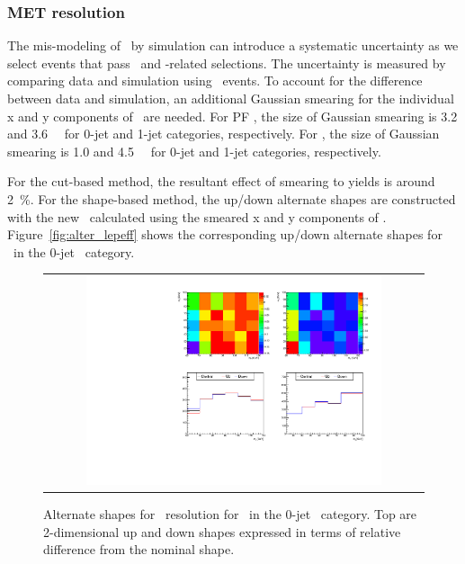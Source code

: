 \subsubsection{MET resolution} 

The mis-modeling of \met\ by simulation can introduce a systematic uncertainty 
as we select events that pass \met\ and \met-related selections. 
The uncertainty is measured 
by comparing data and simulation using \dyll\ events. To account for the 
difference between data and simulation, an additional Gaussian smearing for 
the individual x and y components of \met\ are needed. 
For PF \met, the size of Gaussian smearing is 3.2 and 3.6~\GeV\ %
for 0-jet and 1-jet categories, respectively.  
For \trkmet, the size of Gaussian smearing is 1.0 and 4.5~\GeV\ %
for 0-jet and 1-jet categories, respectively.  

For the cut-based method, the resultant effect of smearing to yields is around 2~\%. 
For the shape-based method, the up/down alternate shapes are constructed 
with the new \mT\ calculated using the smeared x and y components of \met.
Figure~\ref{fig:alter_lepeff} shows the corresponding up/down alternate shapes
for \qqww\ in the 0-jet \DF\ category. 

%
\begin{figure}[htp]
\centering
\begin{tabular}{c}
\includegraphics[width=0.8\textwidth]{figures/histo_qqWW_CMS_hww_MVAMETResBounding_0j_zoom.pdf}
\end{tabular}
\caption{Alternate shapes for \met\ resolution for \qqww\ in the 0-jet \DF\ category.
         Top are 2-dimensional up and down shapes expressed in terms of relative 
         difference from the nominal shape.}
\label{fig:alter_metres}
\end{figure}

